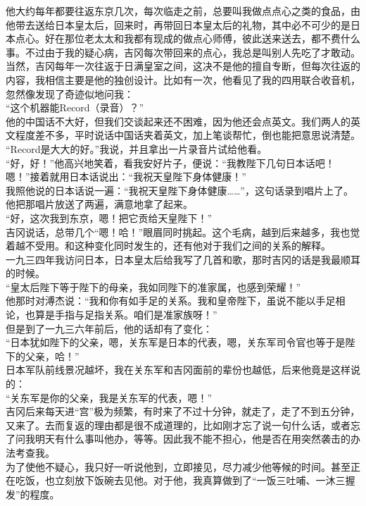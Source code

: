 他大约每年都要往返东京几次，每次临走之前，总要叫我做点点心之类的食品，由他带去送给日本皇太后，回来时，再带回日本皇太后的礼物，其中必不可少的是日本点心。好在那位老太太和我都有现成的做点心师傅，彼此送来送去，都不费什么事。不过由于我的疑心病，吉冈每次带回来的点心，我总是叫别人先吃了才敢动。\\

当然，吉冈每年一次往返于日满皇室之间，这决不是他的擅自专断，但每次往返的内容，我相信主要是他的独创设计。比如有一次，他看见了我的四用联合收音机，忽然像发现了奇迹似地问我：\\

“这个机器能Record（录音）？”\\

他的中国话不大好，但我们交谈起来还不困难，因为他还会点英文。我们两人的英文程度差不多，平时说话中国话夹着英文，加上笔谈帮忙，倒也能把意思说清楚。\\

“Record是大大的好。”我说，并且拿出一片录音片试给他看。\\

“好，好！”他高兴地笑着，看我安好片子，便说：“我教陛下几句日本话吧！嗯！”接着就用日本话说出：“我祝天皇陛下身体健康！”\\

我照他说的日本话说一遍：“我祝天皇陛下身体健康……”，这句话录到唱片上了。他把那唱片放送了两遍，满意地拿了起来。\\

“好，这次我到东京，嗯！把它贡给天皇陛下！”\\

吉冈说话，总带几个“嗯！哈！”眼眉同时挑起。这个毛病，越到后来越多，我也觉着越不受用。和这种变化同时发生的，还有他对于我们之间的关系的解释。\\

一九三四年我访问日本，日本皇太后给我写了几首和歌，那时吉冈的话是我最顺耳的时候。\\

“皇太后陛下等于陛下的母亲，我如同陛下的准家属，也感到荣耀！”\\

他那时对溥杰说：“我和你有如手足的关系。我和皇帝陛下，虽说不能以手足相论，也算是手指与足指关系。咱们是准家族呀！”\\

但是到了一九三六年前后，他的话却有了变化：\\

“日本犹如陛下的父亲，嗯，关东军是日本的代表，嗯，关东军司令官也等于是陛下的父亲，哈！”\\

日本军队前线景况越坏，我在关东军和吉冈面前的辈份也越低，后来他竟是这样说的：\\

“关东军是你的父亲，我是关东军的代表，嗯！”\\

吉冈后来每天进“宫”极为频繁，有时来了不过十分钟，就走了，走了不到五分钟，又来了。去而复返的理由都是很不成道理的，比如刚才忘了说一句什么话，或者忘了问我明天有什么事叫他办，等等。因此我不能不担心，他是否在用突然袭击的办法考查我。\\

为了使他不疑心，我只好一听说他到，立即接见，尽力减少他等候的时间。甚至正在吃饭，也立刻放下饭碗去见他。对于他，我真算做到了“一饭三吐哺、一沐三握发”的程度。